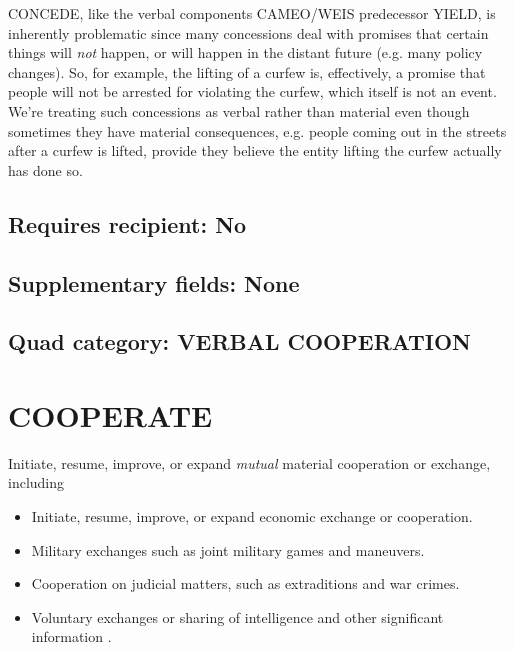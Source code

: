 \documentclass[11pt]{report}
\newcommand{\plcat}[1]{\textsf{#1}}
\newcommand{\ti}[1]{\textit{#1}}
\begin{document}
\plcat{CONCEDE}, like the verbal components CAMEO/WEIS predecessor \plcat{YIELD}, is inherently problematic since many concessions deal with promises that certain things will \ti{not} happen, or will happen in the distant future (e.g. many policy changes). So, for example, the lifting of a curfew is, effectively, a promise that people will not be arrested for violating the curfew, which itself is not an event. We're treating such concessions as verbal rather than material even though sometimes they have material consequences, e.g. people coming out in the streets after a curfew is lifted, provide they believe the entity lifting the curfew actually has done so.  

\subsection{Requires recipient: No}

\subsection{Supplementary fields: None}
 
\subsection{Quad category: VERBAL COOPERATION}


\newpage  

\section{COOPERATE}

Initiate, resume, improve, or expand \ti{mutual} material cooperation or exchange, including

\begin{itemize}
\item Initiate, resume, improve, or expand economic exchange or cooperation.

\item Military exchanges such as joint military games and maneuvers.

\item Cooperation on judicial matters, such as extraditions and war crimes.

\item Voluntary exchanges or sharing of intelligence and other significant information .

\end{itemize}
\end{document}
